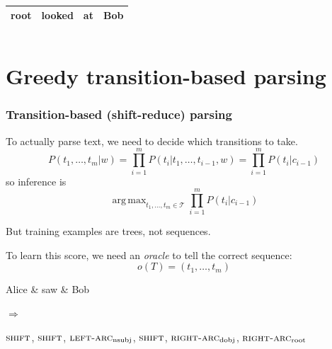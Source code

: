 \documentclass[t]{beamer}
\DeclareMathOperator*{\argmax}{arg\,max}
\begin{document}
\begin{frame}
{\begin{varwidth}{2.2\linewidth}
{\begin{dependency}
\begin{deptext}[column sep=.7cm]
	\end{deptext}
	\end{dependency}
	\\
	\begin{tabular}{|l|l|l|l|}\hline
	\color{red} root & \color{red} looked & \color{red} at & \color{red} Bob \\ \hline
	\end{tabular}
	\hspace{6mm}
	\begin{tabular}{|l|}\hline
	\quad \\ \hline
	\end{tabular}
	}
    \end{varwidth}
	}
\end{frame}

\section{Greedy transition-based parsing}

\begin{frame}
  \frametitle{Transition-based (shift-reduce) parsing}
    To actually parse text, we need to decide which transitions to take.
    \[
        P(t_1,\ldots,t_m|w)=\prod_{i=1}^mP(t_i|t_1,\ldots,t_{i-1},w)=\prod_{i=1}^mP(t_i|c_{i-1})
    \]
    so inference is
    \[
    \argmax_{t_1,\ldots,t_m \in \mathcal{T}} \prod_{i=1}^mP(t_i|c_{i-1})
    \]

    But training examples are trees, not sequences.
    
    To learn this score, we need an \textit{oracle} to tell the correct sequence:
    \[
    o(T)=(t_1,\ldots,t_m)
    \]
    
    \pause\vfill
    
    \begin{minipage}{.5\textwidth}
	\begin{dependency}
	\begin{deptext}[column sep=.7cm]
	Alice \& saw \& Bob \\
	\end{deptext}
	\end{dependency}
	\end{minipage}
    \begin{minipage}{.1\textwidth}
	$\Rightarrow$
	\end{minipage}
    \begin{minipage}{.2\textwidth}
    $\textsc{shift}$,
	$\textsc{shift}$,
	$\textsc{left-arc}_\mathrm{nsubj}$,
	$\textsc{shift}$,
	$\textsc{right-arc}_\mathrm{dobj}$,
	$\textsc{right-arc}_\mathrm{root}$
	\end{minipage}
\end{frame}
\end{document}
